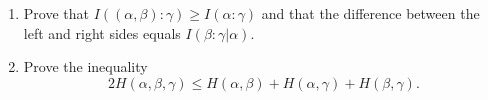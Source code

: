\documentclass[a4paper]{article}
\begin{document}
\begin{enumerate}
  \item Prove that \(I((\alpha,\beta):\gamma) \geq I(\alpha:\gamma)\) and that the difference between the left and right sides equals \(I(\beta:\gamma|\alpha)\).

  \item Prove the inequality 
  \[
  2H(\alpha,\beta,\gamma) \leq H(\alpha, \beta) + H(\alpha, \gamma) + H(\beta,\gamma).
  \]


\end{enumerate}
\end{document}

